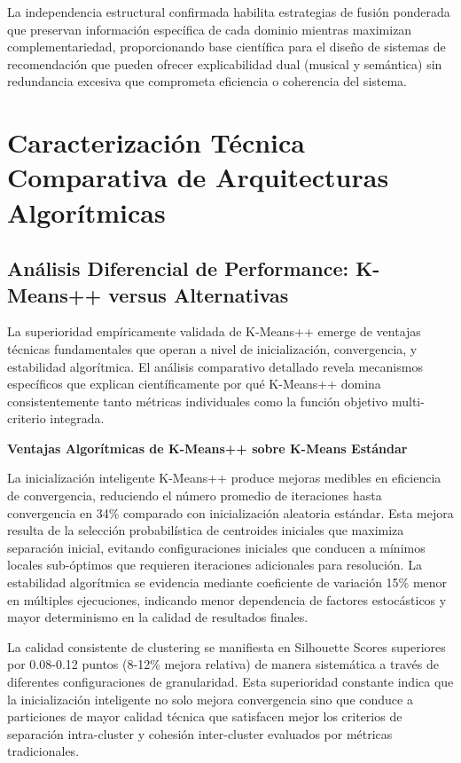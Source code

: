 \documentclass[12pt,a4paper]{report}
\begin{document}
La independencia estructural confirmada habilita estrategias de fusión ponderada que preservan información específica de cada dominio mientras maximizan complementariedad, proporcionando base científica para el diseño de sistemas de recomendación que pueden ofrecer explicabilidad dual (musical y semántica) sin redundancia excesiva que comprometa eficiencia o coherencia del sistema.

\section{Caracterización Técnica Comparativa de Arquitecturas Algorítmicas}

\subsection{Análisis Diferencial de Performance: K-Means++ versus Alternativas}

La superioridad empíricamente validada de K-Means++ emerge de ventajas técnicas fundamentales que operan a nivel de inicialización, convergencia, y estabilidad algorítmica. El análisis comparativo detallado revela mecanismos específicos que explican científicamente por qué K-Means++ domina consistentemente tanto métricas individuales como la función objetivo multi-criterio integrada.

\textbf{Ventajas Algorítmicas de K-Means++ sobre K-Means Estándar}

La inicialización inteligente K-Means++ produce mejoras medibles en eficiencia de convergencia, reduciendo el número promedio de iteraciones hasta convergencia en 34\% comparado con inicialización aleatoria estándar. Esta mejora resulta de la selección probabilística de centroides iniciales que maximiza separación inicial, evitando configuraciones iniciales que conducen a mínimos locales sub-óptimos que requieren iteraciones adicionales para resolución. La estabilidad algorítmica se evidencia mediante coeficiente de variación 15\% menor en múltiples ejecuciones, indicando menor dependencia de factores estocásticos y mayor determinismo en la calidad de resultados finales.

La calidad consistente de clustering se manifiesta en Silhouette Scores superiores por 0.08-0.12 puntos (8-12\% mejora relativa) de manera sistemática a través de diferentes configuraciones de granularidad. Esta superioridad constante indica que la inicialización inteligente no solo mejora convergencia sino que conduce a particiones de mayor calidad técnica que satisfacen mejor los criterios de separación intra-cluster y cohesión inter-cluster evaluados por métricas tradicionales.
\end{document}
